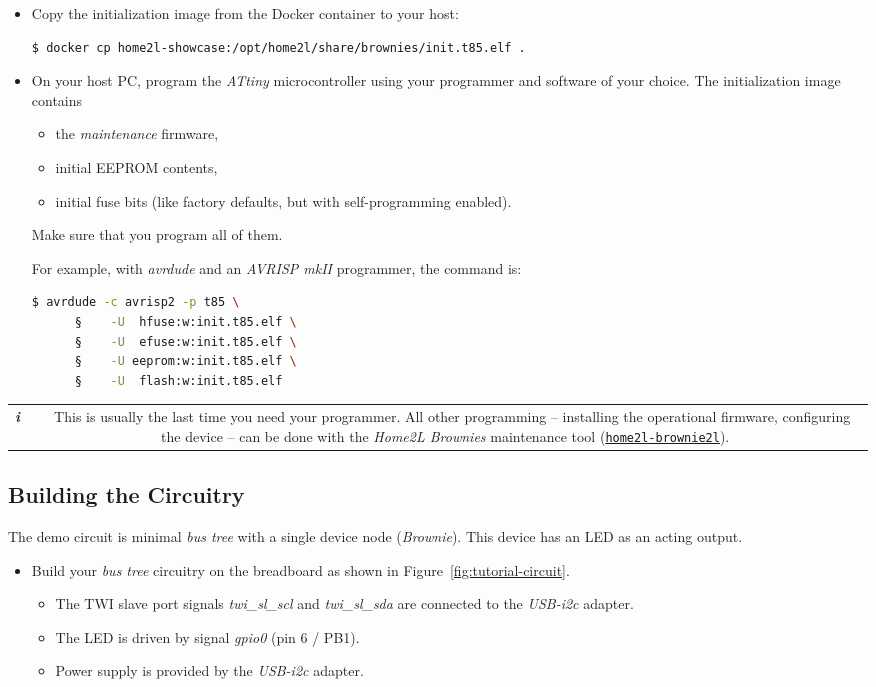 \documentclass[12pt,english,parskip=half,headheight=19pt]{scrreprt}
\newcommand{\lst}[1]{\colorbox{lstbackground}{\footnotesize\code{#1}}}
\newcommand{\infobox}[1]{
  \par
  \medskip
  \hfill
  \setlength\arrayrulewidth{1pt}
  \begin{tabular}[t]{c|c|}
    \parbox{1.8em}{\hfill\textit{\Huge\textbf{i}\,}}
    &
    \,\parbox{0.89\linewidth}{\setlength{\parskip}{0.5em} \small #1}\,
  \end{tabular}
  \medskip
  \par
}
\newcommand{\idx}[1]{#1\index{#1}}
\newcommand{\reftool}[1]{\hyperref[tool:#1]{\texttt{\idx{#1}}}}
\begin{document}
\begin{itemize}[$\blacktriangleright$]
  \item
    Copy the initialization image from the Docker container to your host:
    \begin{lstlisting}[language=bash]
      $ docker cp home2l-showcase:/opt/home2l/share/brownies/init.t85.elf .
    \end{lstlisting}

  \item
    On your host PC, program the \textit{ATtiny} microcontroller using your programmer and software
    of your choice. The initialization image \lst{init.t85.elf} contains
    \begin{itemize}
      \item the \textit{maintenance} firmware,
      \item initial EEPROM contents,
      \item initial fuse bits (like factory defaults, but with self-programming enabled).
    \end{itemize}
    Make sure that you program all of them.

    For example, with \textit{avrdude} and an \textit{AVRISP mkII} programmer, the command is:
    \begin{lstlisting}[language=bash]
      $ avrdude -c avrisp2 -p t85 \
      §    -U  hfuse:w:init.t85.elf \
      §    -U  efuse:w:init.t85.elf \
      §    -U eeprom:w:init.t85.elf \
      §    -U  flash:w:init.t85.elf
    \end{lstlisting}

\end{itemize}


\infobox{
  This is usually the last time you need your programmer. All other programming --
  installing the operational firmware, configuring the device -- can be done with the
  \textit{Home2L Brownies} maintenance tool (\reftool{home2l-brownie2l}).
}



\subsection{Building the Circuitry}
\label{sec:tutorial-brownies-circuit}

The demo circuit is minimal \textit{bus tree} with a single device node (\textit{Brownie}). This device has an LED as an acting output.

\begin{itemize}[$\blacktriangleright$]
  \item
    Build your \textit{bus tree} circuitry on the breadboard as shown in
    Figure~\ref{fig:tutorial-circuit}.
    \begin{itemize}
      \item The TWI slave port signals \textit{twi\_sl\_scl} and \textit{twi\_sl\_sda} are connected
            to the \textit{USB-i2c} adapter.
      \item The LED is driven by signal \textit{gpio0} (pin 6 / PB1).
      \item Power supply is provided by the \textit{USB-i2c} adapter.
    \end{itemize}
\end{itemize}
\end{document}
